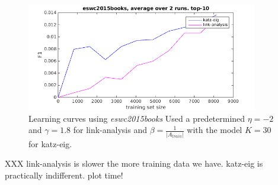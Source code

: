 \begin{figure}[ht]
  \centering
    \includegraphics[width=0.9\textwidth]{fig/learning_curves/eswc2015books_learning_curves.png}
    \caption{Learning curves using \textit{eswc2015books}
        Used a predetermined $\eta = -2$ and $\gamma = 1.8$ for link-analysis and $\beta = \frac{1}{|A_{train}|}$ with the model $K = 30$ for katz-eig.}
\end{figure}




XXX link-analysis is slower the more training data we have.
katz-eig is practically indifferent.
plot time!

\FloatBarrier
